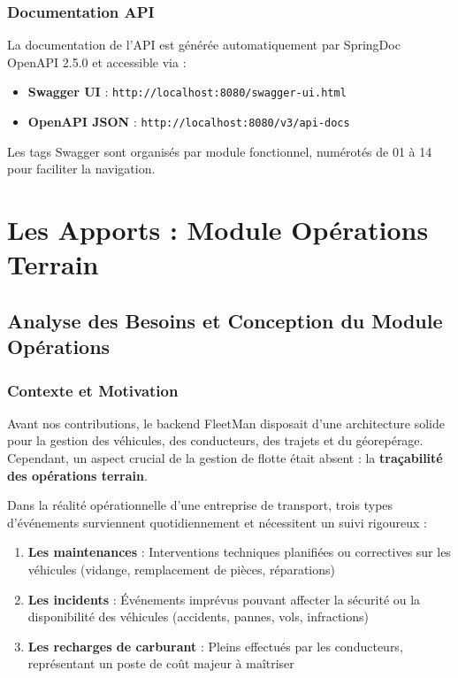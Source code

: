 \documentclass[12pt,a4paper]{report}
\begin{document}
\section{Documentation API}

La documentation de l'API est générée automatiquement par SpringDoc OpenAPI 2.5.0 et accessible via :
\begin{itemize}[leftmargin=2cm]
  \item \textbf{Swagger UI} : \texttt{http://localhost:8080/swagger-ui.html}
  \item \textbf{OpenAPI JSON} : \texttt{http://localhost:8080/v3/api-docs}
\end{itemize}

Les tags Swagger sont organisés par module fonctionnel, numérotés de 01 à 14 pour faciliter la navigation.

\part{Les Apports : Module Opérations Terrain}

\chapter{Analyse des Besoins et Conception du Module Opérations}

\section{Contexte et Motivation}

Avant nos contributions, le backend FleetMan disposait d'une architecture solide pour la gestion des véhicules, des conducteurs, des trajets et du géorepérage. Cependant, un aspect crucial de la gestion de flotte était absent : la \textbf{traçabilité des opérations terrain}.

Dans la réalité opérationnelle d'une entreprise de transport, trois types d'événements surviennent quotidiennement et nécessitent un suivi rigoureux :

\begin{enumerate}[leftmargin=2cm]
  \item \textbf{Les maintenances} : Interventions techniques planifiées ou correctives sur les véhicules (vidange, remplacement de pièces, réparations)
  \item \textbf{Les incidents} : Événements imprévus pouvant affecter la sécurité ou la disponibilité des véhicules (accidents, pannes, vols, infractions)
  \item \textbf{Les recharges de carburant} : Pleins effectués par les conducteurs, représentant un poste de coût majeur à maîtriser
\end{enumerate}
\end{document}
